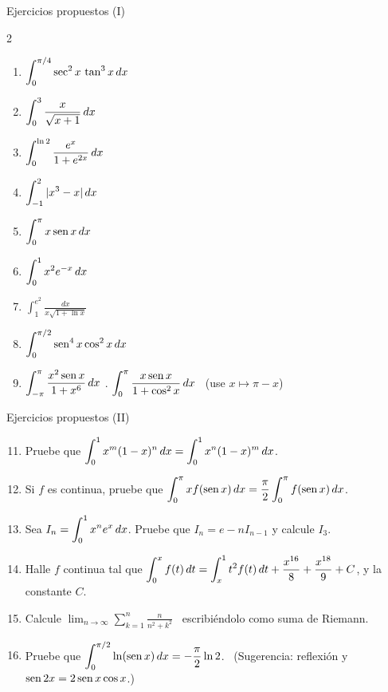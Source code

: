 \documentclass[10pt,aspectratio=169]{beamer}
\begin{document}
\begin{frame}{Ejercicios propuestos (I)}
  \begin{ejercicio}
    \begin{multicols}{2}
    \begin{enumerate}
      \item $\displaystyle\int_0^{\pi/4}\sec^2x\,\tan^3x\,dx$
      \item $\displaystyle\int_0^{3}\frac{x}{\sqrt{x+1}}\,dx$
      \item $\displaystyle\int_0^{\ln 2}\frac{e^x}{1+e^{2x}}\,dx$
      \item $\displaystyle\int_{-1}^2|x^3-x|\,dx$
      \item $\displaystyle\int_0^{\pi}x\operatorname{sen} x\,dx$
      \item $\displaystyle\int_0^{1}x^2e^{-x}\,dx$
      \item $\displaystyle\int_1^{e^2}\frac{dx}{x\sqrt{1+\ln x}}$
      \item $\displaystyle\int_0^{\pi/2}\operatorname{sen}^4x\cos^2x\,dx$
    \end{enumerate}
    \end{multicols}
  \end{ejercicio}
  \begin{ejercicio}
    \begin{enumerate}
      \setcounter{enumi}{8}
      \item $\displaystyle\int_{-\pi}^{\pi}\frac{x^2\operatorname{sen} x}{1+x^6}\,dx$ . $\displaystyle\int_0^{\pi}\frac{x\operatorname{sen} x}{1+\cos^2x}\,dx$
        \ \small(use $x\mapsto\pi-x$)
    \end{enumerate}
  \end{ejercicio}
\end{frame}

\begin{frame}{Ejercicios propuestos (II)}
  \begin{ejercicio}
    \begin{enumerate}
      \setcounter{enumi}{10}
      \item Pruebe que $\displaystyle\int_0^1x^m(1-x)^n\,dx=\int_0^1x^n(1-x)^m\,dx$.
      \item Si $f$ es continua, pruebe que $\displaystyle\int_0^{\pi}xf(\operatorname{sen} x)\,dx=\frac\pi2\int_0^\pi f(\operatorname{sen} x)\,dx$.
      \item Sea $I_n=\displaystyle\int_0^1x^ne^x\,dx$. Pruebe que $I_n=e-nI_{n-1}$ y calcule $I_3$.
      \item Halle $f$ continua tal que $\displaystyle\int_0^xf(t)\,dt=\int_x^1t^2f(t)\,dt+\frac{x^{16}}{8}+\frac{x^{18}}{9}+C$, y la constante $C$.
      \item Calcule $\displaystyle\lim_{n\to\infty}\sum_{k=1}^n\frac{n}{n^2+k^2}$ \ escribiéndolo como suma de Riemann.
      \item Pruebe que $\displaystyle\int_0^{\pi/2}\ln(\operatorname{sen} x)\,dx=-\frac\pi2\ln2$. \ \small(Sugerencia: reflexión y $\operatorname{sen}2x=2\operatorname{sen} x\cos x$.)
    \end{enumerate}
  \end{ejercicio}
\end{frame}
\end{document}
